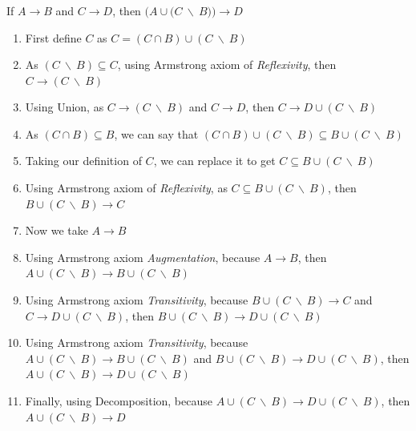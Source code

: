 \documentclass[letterpaper]{article}
\theoremstyle{plain}
\theoremstyle{definition}
\theoremstyle{remark}
\begin{document}
\subsubsection{}
\begin{center}
    If $A\rightarrow B$ and $C \rightarrow D$, then $\big(A\cup\big(C~\backslash~B\big)\big)\rightarrow D$
\end{center}
\begin{enumerate}
    \item First define $C$ as $C=(C\cap B) \cup (C~\backslash~B)$
    \item As $(C~\backslash~B)\subseteq C$, using Armstrong axiom of \textit{Reflexivity}, then $C \rightarrow (C~\backslash~B)$
    \item Using Union, as $C \rightarrow (C~\backslash~B)$ and $C\rightarrow D$, then $C \rightarrow D\cup(C~\backslash~B)$
    \item As $(C\cap B)\subseteq B$, we can say that $(C\cap B)\cup(C~\backslash~B)\subseteq B\cup(C~\backslash~B)$
    \item Taking our definition of $C$, we can replace it to get $C\subseteq B\cup(C~\backslash~B)$
    \item Using Armstrong axiom of \textit{Reflexivity}, as $C\subseteq B\cup(C~\backslash~B)$, then $B\cup(C~\backslash~B)\rightarrow C$ 
    \item Now we take $A\rightarrow B$
    \item Using Armstrong axiom \textit{Augmentation}, because $A\rightarrow B$, then $A\cup(C~\backslash~B)\rightarrow B\cup(C~\backslash~B)$
    \item Using Armstrong axiom \textit{Transitivity}, because $B\cup(C~\backslash~B)\rightarrow C$ and $C \rightarrow D\cup(C~\backslash~B)$, then \newline $B\cup(C~\backslash~B)\rightarrow D\cup(C~\backslash~B)$
    \item Using Armstrong axiom \textit{Transitivity}, because $A\cup(C~\backslash~B)\rightarrow B\cup(C~\backslash~B)$ and $B\cup(C~\backslash~B)\rightarrow D\cup(C~\backslash~B)$, then \newline $A\cup(C~\backslash~B)\rightarrow D\cup(C~\backslash~B)$
    \item Finally, using Decomposition, because $A\cup(C~\backslash~B)\rightarrow D\cup(C~\backslash~B)$, then $A\cup(C~\backslash~B)\rightarrow D$
\end{enumerate}

\newpage
\end{document}
